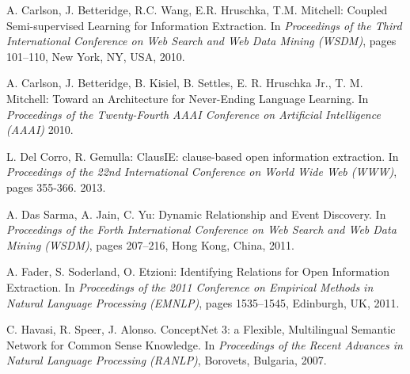 \documentclass[11pt,a4paper]{article}
\begin{document}
\begin{thebibliography}{99}
 A. Carlson, J. Betteridge, R.C. Wang, E.R. Hruschka, T.M. Mitchell: Coupled Semi-supervised Learning for Information Extraction. In \textit{Proceedings of the Third International Conference on Web Search and Web Data Mining (WSDM)}, pages 101--110, New York, NY, USA, 2010.
		 
		 
 A. Carlson, J. Betteridge, B. Kisiel, B. Settles, E. R. Hruschka Jr., T. M. Mitchell: Toward an Architecture for Never-Ending Language Learning.  In \textit{Proceedings of the Twenty-Fourth AAAI Conference on Artificial Intelligence (AAAI)} 2010.

 L. Del Corro, R. Gemulla: ClausIE: clause-based open information extraction. In \textit{Proceedings  of the 22nd International Conference on World Wide Web (WWW)}, pages 355-366. 2013.

%

 A. Das Sarma, A. Jain, C. Yu: Dynamic Relationship and Event Discovery.  In \textit{Proceedings of the Forth International Conference on Web Search and Web Data Mining (WSDM)}, pages 207--216, Hong Kong, China, 2011.

 A. Fader, S. Soderland, O. Etzioni: Identifying Relations for Open Information Extraction. In \textit{Proceedings of the 2011 Conference on Empirical Methods in Natural Language Processing (EMNLP)}, pages 1535--1545, Edinburgh, UK, 2011.
%               		 
%	
	
 C. Havasi, R. Speer,  J. Alonso. ConceptNet 3: a Flexible, Multilingual Semantic Network for Common Sense Knowledge.  In \textit{Proceedings of the Recent Advances in Natural Language Processing (RANLP)}, Borovets, Bulgaria, 2007.
	
%	 


\end{thebibliography}
\end{document}
